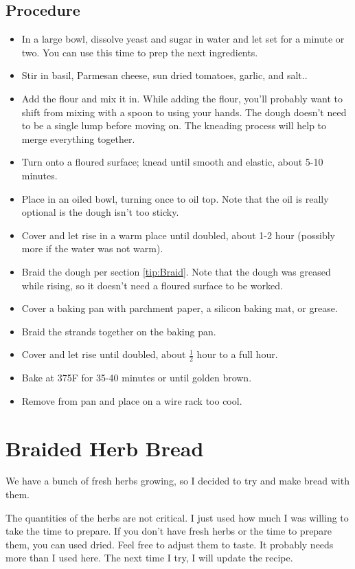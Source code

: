 \documentclass[10pt, openany]{book}
\begin{document}
\subsection{Procedure}
\begin{itemize}
  \item In a large bowl, dissolve yeast and sugar in water and let set for a minute or two.  You can use this time to prep the next ingredients.
  \item Stir in basil, Parmesan cheese, sun dried tomatoes, garlic, and salt..
  \item Add the flour and mix it in.  While adding the flour, you'll probably want to shift from mixing with a spoon to using your hands.  The dough doesn't need to be a single lump before moving on.  The kneading process will help to merge everything together.
  \item Turn onto a floured surface; knead until smooth and elastic, about 5-10 minutes.
  \item Place in an oiled bowl, turning once to oil top.  Note that the oil is really optional is the dough isn't too sticky.
  \item Cover and let rise in a warm place until doubled, about 1-2 hour (possibly more if the water was not warm).
  \item Braid the dough per section \ref{tip:Braid}.  Note that the dough was greased while rising, so it doesn't need a floured surface to be worked.
  \item Cover a baking pan with parchment paper, a silicon baking mat, or grease.
  \item Braid the strands together on the baking pan.
  \item Cover and let rise until doubled, about $\frac{1}{2}$ hour to a full hour.
  \item Bake at 375\degree{}F for 35-40 minutes or until golden brown.
  \item Remove from pan and place on a wire rack too cool.
\end{itemize}

\section{Braided Herb Bread}
\label{bread:Herb}
We have a bunch of fresh herbs growing, so I decided to try and make bread with them.

The quantities of the herbs are not critical.  I just used how much I was willing to take the time to prepare.  If you don't have fresh herbs or the time to prepare them, you can used dried.  Feel free to adjust them to taste.  It probably needs more than I used here.  The next time I try, I will update the recipe.
\end{document}
